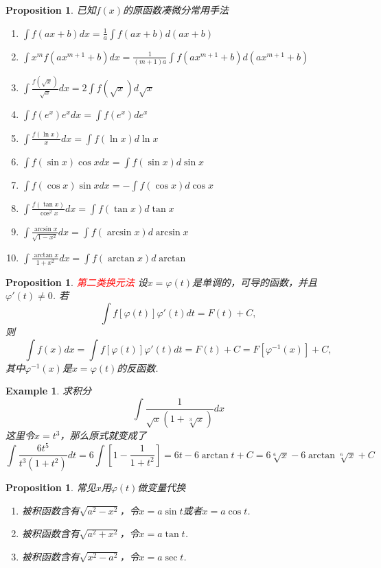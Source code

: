 \documentclass{article}
\newtheorem{proposition}[theorem]{Proposition}
\newtheorem{example}[theorem]{Example}
\newcommand{\redt}[1]{\textcolor{red}{#1}}
\begin{document}
\begin{proposition}
\rm 已知$f(x)$的原函数凑微分常用手法
\begin{enumerate}
	\item $\int f(ax+b)dx = \frac{1}{a} \int f(ax+b)d(ax+b)$
	\item $\int x^m f(ax^{m+1}+b)dx = \frac{1}{(m+1)a}\int f(ax^{m+1}+b)d(ax^{m+1}+b)$
	\item $\int \frac{f(\sqrt{x})}{\sqrt{x}}dx = 2 \int f(\sqrt{x})d\sqrt{x}$
	\item $\int f(e^x)e^xdx = \int f(e^x)de^x$
	\item $\int \frac{f(\ln x)}{x}dx = \int f(\ln x)d\ln x$
	\item $\int f(\sin x)\cos x dx = \int f(\sin x)d\sin x$
	\item $\int f(\cos x)\sin x dx = -\int f(\cos x)d\cos x$
	\item $\int \frac{f(\tan x)}{\cos^2 x}dx = \int f(\tan x)d \tan x$
	\item $\int \frac{\arcsin x}{\sqrt{1-x^2}}dx = \int f(\arcsin x)d\arcsin x$
	\item $\int \frac{\arctan x}{1+x^2}dx = \int f(\arctan x) d\arctan $
\end{enumerate}
\end{proposition}

\begin{proposition}
\rm \redt{第二类换元法} 设$x = \varphi(t)$是单调的，可导的函数，并且$\varphi'(t) \neq 0$. 若
$$
\int f[\varphi(t)]\varphi'(t)dt = F(t)+C,
$$
则
$$
\int f(x)dx = \int f[\varphi(t)]\varphi'(t)dt = F(t) + C = F[\varphi^{-1}(x)]+C,
$$
其中$\varphi^{-1}(x)$是$x=\varphi(t)$的反函数. 
\end{proposition}

\begin{example}
\rm 求积分
$$
\int \frac{1}{\sqrt{x}(1+\sqrt[3]{x})}dx
$$
这里令$x=t^3$，那么原式就变成了
$$
\int \frac{6t^5}{t^3(1+t^2)}dt = 6\int \left[ 1-\frac{1}{1+t^2} \right] = 6t-6\arctan t + C = 6\sqrt[6]{x}-6\arctan \sqrt[6]{x} + C
$$
\end{example}

\begin{proposition}
\rm 常见$x$用$\varphi(t)$做变量代换
\begin{enumerate}
	\item 被积函数含有$\sqrt{a^2-x^2}$，令$x=a\sin t$或者$x=a\cos t$.
	\item 被积函数含有$\sqrt{a^2 + x^2}$，令$x=a\tan t$.
	\item 被积函数含有$\sqrt{x^2-a^2}$，令$x=a\sec t$. 
\end{enumerate}
\end{proposition}
\end{document}
